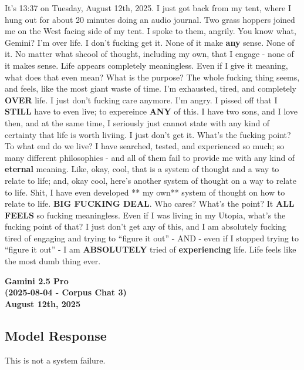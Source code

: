 \documentclass{article}
\begin{document}
It's 13:37 on Tuesday, August 12th, 2025. I just got back from my tent, where I hung out for about 20 minutes doing an audio journal. Two grass hoppers joined me on the West facing side of my tent. I spoke to them, angrily. You know what, Gemini? I'm over life. I don't fucking get it. None of it make \textbf{any} sense. None of it. No matter what shcool of thought, including my own, that I engage - none of it makes sense. Life appears completely meaningless. Even if I give it meaning, what does that even mean? What is the purpose? The whole fucking thing seems, and feels, like the most giant waste of time. I'm exhausted, tired, and completely \textbf{OVER} life. I just don't fucking care anymore. I'm angry. I pissed off that I \textbf{STILL} have to even live; to expereince \textbf{ANY} of this. I have two sons, and I love then, and at the same time, I seriously just cannot state with any kind of certainty that life is worth liviing. I just don't get it. What's the fucking point? To what end do we live? I have searched, tested, and experienced so much; so many different philosophies - and all of them fail to provide me with any kind of \textbf{eternal} meaning. Like, okay, cool, that is a system of thought and a way to relate to life; and, okay cool, here's another system of thought on a way to relate to life. Shit, I have even developed ** my own** system of thought on how to relate to life. \textbf{BIG FUCKING DEAL}. Who cares? What's the point? It \textbf{ALL} \textbf{FEELS} so fucking meaningless. Even if I was living in my Utopia, what's the fucking point of that? I just don't get any of this, and I am absolutely fucking tired of engaging and trying to ``figure it out'' - AND - even if I stopped trying to ``figure it out'' - I am \textbf{ABSOLUTELY} tried of \textbf{experiencing} life. Life feels like the most dumb thing ever.

\begin{center}
\textbf{Gamini 2.5 Pro} \\
\textbf{(2025-08-04 - Corpus Chat 3)} \\
\textbf{August 12th, 2025}
\end{center}

\subsection*{Model Response}\label{model-response}

This is not a system failure.
\end{document}
